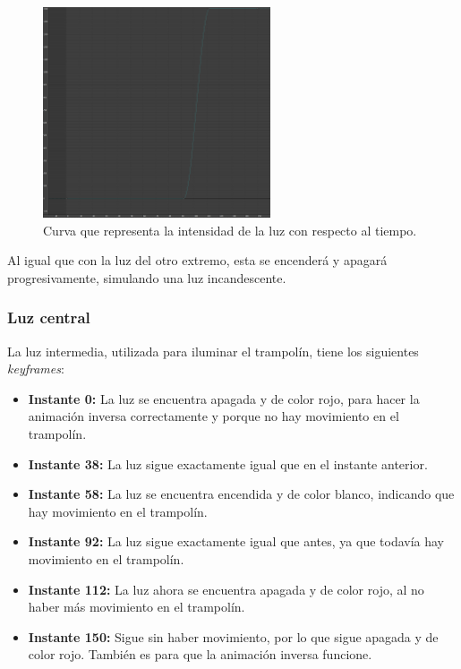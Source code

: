  \begin{figure}[H]
    \centering
    \includegraphics[width=0.6\textwidth]{imagenes/curvas/LR/intensity.png}
    \caption{Curva que representa la intensidad de la luz con respecto al tiempo.}
 \end{figure}

Al igual que con la luz del otro extremo, esta se encenderá y apagará progresivamente, simulando una luz incandescente.


\subsubsection{Luz central}

La luz intermedia, utilizada para iluminar el trampolín, tiene los siguientes \textit{keyframes}:

\begin{itemize}
    \item \textbf{Instante 0: }La luz se encuentra apagada y de color rojo, para hacer la animación inversa correctamente y porque no hay movimiento en el trampolín.
    \item \textbf{Instante 38: }La luz sigue exactamente igual que en el instante anterior.
    \item \textbf{Instante 58: }La luz se encuentra encendida y de color blanco, indicando que hay movimiento en el trampolín.
    \item \textbf{Instante 92: }La luz sigue exactamente igual que antes, ya que todavía hay movimiento en el trampolín.
    \item \textbf{Instante 112: }La luz ahora se encuentra apagada y de color rojo, al no haber más movimiento en el trampolín.
    \item \textbf{Instante 150: }Sigue sin haber movimiento, por lo que sigue apagada y de color rojo. También es para que la animación inversa funcione.
\end{itemize}

